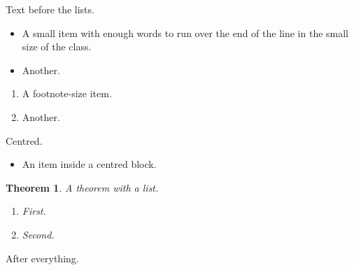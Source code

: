 \documentclass{article}
\newtheorem{theorem}{Theorem}
\begin{document}
Text before the lists.
{\small
\begin{itemize}
\item A small item with enough words to run over the end of the line in the small size of the class.
\item Another.
\end{itemize}}
{\footnotesize
\begin{enumerate}
\item A footnote-size item.
\item Another.
\end{enumerate}}
\begin{center}
Centred.
\begin{itemize}
\item An item inside a centred block.
\end{itemize}
\end{center}
\begin{theorem}
A theorem with a list.
\begin{enumerate}
\item First.
\item Second.
\end{enumerate}
\end{theorem}
After everything.
\end{document}
